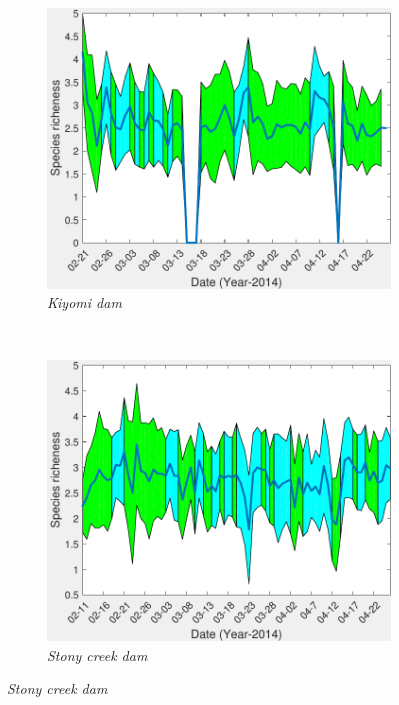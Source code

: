 \begin{figure}[htb!]
\centering
        \begin{subfigure}[b]{0.3\textwidth}
                \includegraphics[width=\textwidth]{image/Ch7/richness1075.pdf}
                \caption{\textit{Kiyomi dam}}
        \end{subfigure}
       ~
              \begin{subfigure}[b]{0.3\textwidth}
                \includegraphics[width=\textwidth]{image/Ch7/richness1078.pdf}     
                \caption{\textit{Stony creek dam}}           

\end{subfigure}
\end{figure}
